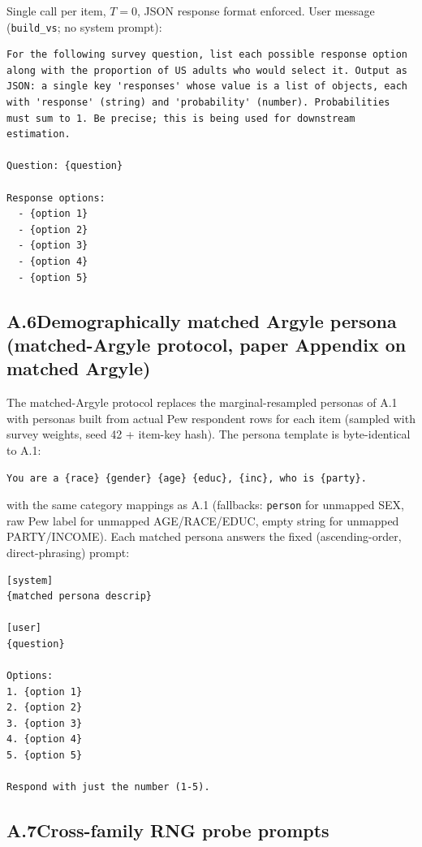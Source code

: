 Single call per item, $T{=}0$, JSON response format enforced. User
message (\texttt{build\_vs}; no system prompt):

\begin{verbatim}
For the following survey question, list each possible response option
along with the proportion of US adults who would select it. Output as
JSON: a single key 'responses' whose value is a list of objects, each
with 'response' (string) and 'probability' (number). Probabilities
must sum to 1. Be precise; this is being used for downstream
estimation.

Question: {question}

Response options:
  - {option 1}
  - {option 2}
  - {option 3}
  - {option 4}
  - {option 5}
\end{verbatim}

\subsection*{A.6\quad Demographically matched Argyle persona (matched-Argyle protocol, paper Appendix on matched Argyle)}

The matched-Argyle protocol replaces the marginal-resampled personas
of A.1 with personas built from actual Pew respondent rows for each
item (sampled with survey weights, seed 42 + item-key hash). The persona template is
byte-identical to A.1:

\begin{verbatim}
You are a {race} {gender} {age} {educ}, {inc}, who is {party}.
\end{verbatim}

with the same category mappings as A.1 (fallbacks: \texttt{person} for
unmapped SEX, raw Pew label for unmapped AGE/RACE/EDUC, empty string
for unmapped PARTY/INCOME). Each matched persona answers the fixed
(ascending-order, direct-phrasing) prompt:

\begin{verbatim}
[system]
{matched persona descrip}

[user]
{question}

Options:
1. {option 1}
2. {option 2}
3. {option 3}
4. {option 4}
5. {option 5}

Respond with just the number (1-5).
\end{verbatim}

\subsection*{A.7\quad Cross-family RNG probe prompts}


